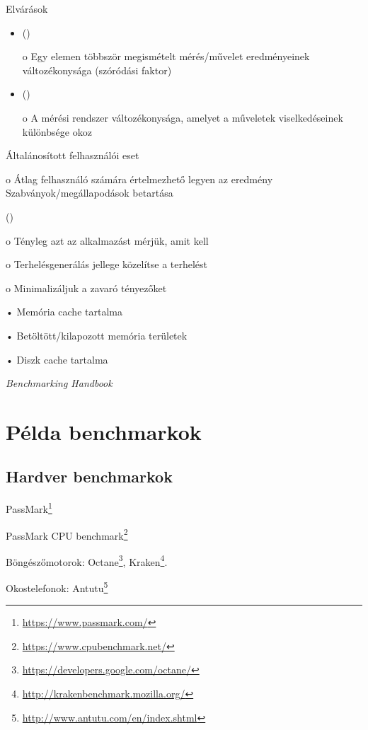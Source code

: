 Elvárások

\begin{itemize}
	\item {} ()
	
	o Egy elemen többször megismételt mérés/művelet eredményeinek változékonysága (szóródási faktor)
	
	\item {} ()
	
	o A mérési rendszer változékonysága, amelyet a műveletek viselkedéseinek különbsége okoz
\end{itemize}

Általánosított felhasználói eset

o Átlag felhasználó számára értelmezhető legyen az
eredmény
Szabványok/megállapodások betartása

 ()

o Tényleg azt az alkalmazást mérjük, amit kell

o Terhelésgenerálás jellege közelítse a  terhelést

o Minimalizáljuk a zavaró tényezőket

• Memória cache tartalma

• Betöltött/kilapozott memória területek

• Diszk cache tartalma

\emph{Benchmarking Handbook}~\cite{DBLP:books/mk/Gray93}


\section{Példa benchmarkok\kieg}

\subsection{Hardver benchmarkok}

PassMark\footnote{\url{https://www.passmark.com/}}

PassMark CPU benchmark\footnote{\url{https://www.cpubenchmark.net/}}

Böngészőmotorok: Octane\footnote{\url{https://developers.google.com/octane/}},
Kraken\footnote{\url{http://krakenbenchmark.mozilla.org/}}.

Okostelefonok: Antutu\footnote{\url{http://www.antutu.com/en/index.shtml}}


